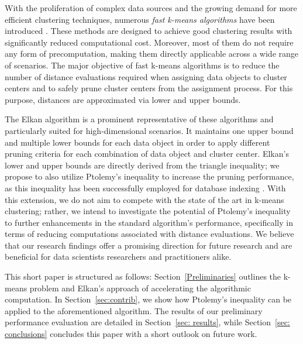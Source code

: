 With the proliferation of complex data sources and the growing demand for more efficient clustering techniques, numerous \emph{fast k-means algorithms} have been introduced \cite{DBLP:conf/icml/Elkan03,DBLP:conf/sdm/Hamerly10,drake2012accelerated,hamerly2015accelerating,DBLP:conf/icml/NewlingF16,DBLP:conf/icml/DingZSMM15,DBLP:conf/sisap/SchubertLF21,DBLP:conf/sisap/LangS23}. These methods are designed to achieve good clustering results with significantly reduced computational cost. Moreover, most of them do not require any form of precomputation, making them directly applicable across a wide range of scenarios. The major objective of fast k-means algorithms is to reduce the number of distance evaluations required when assigning data objects to cluster centers and to safely prune cluster centers from the assignment process. For this purpose, distances are approximated via lower and upper bounds.

The Elkan algorithm \cite{DBLP:conf/icml/Elkan03} is a prominent representative of these algorithms and particularly suited for high-dimensional scenarios.
It maintains one upper bound and multiple lower bounds for each data object in order to apply different pruning criteria for each combination of data object and cluster center.
Elkan's lower and upper bounds are directly derived from the triangle inequality; we propose to also utilize Ptolemy's inequality to increase the pruning performance, as this inequality has been successfully employed for database indexing \cite{hetlandPtolemaicAccessMethods2013,hetlandPtolemaicIndexing2015}.
With this extension, we do not aim to compete with the state of the art in k-means clustering;
rather, we intend to investigate the potential of Ptolemy’s inequality to further enhancements in the standard algorithm’s performance, specifically in terms of reducing computations associated with distance evaluations. We believe that our research findings offer a promising direction for future research and are beneficial for data scientists researchers and practitioners alike.

This short paper is structured as follows:
Section~\ref{Preliminaries} outlines the k-means problem and Elkan's approach of accelerating the algorithmic computation.
In Section~\ref{sec:contrib}, we show how Ptolemy's inequality can be applied to the aforementioned algorithm. %
The results of our preliminary performance evaluation are detailed in Section~\ref{sec: results}, while Section~\ref{sec: conclusions} concludes this paper with a short outlook on future work.







